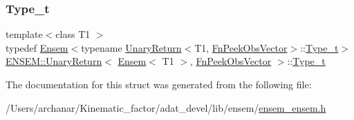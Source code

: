 \subsubsection{\texorpdfstring{Type\_t}{Type\_t}\hspace{0.1cm}{\footnotesize\ttfamily [2/2]}}
{\footnotesize\ttfamily template$<$class T1 $>$ \\
typedef \mbox{\hyperlink{classENSEM_1_1Ensem}{Ensem}}$<$typename \mbox{\hyperlink{structENSEM_1_1UnaryReturn}{Unary\+Return}}$<$T1, \mbox{\hyperlink{structENSEM_1_1FnPeekObsVector}{Fn\+Peek\+Obs\+Vector}}$>$\+::\mbox{\hyperlink{structENSEM_1_1UnaryReturn_3_01Ensem_3_01T1_01_4_00_01FnPeekObsVector_01_4_a1dc591fee09e0be58d290f5f4062e2d7}{Type\+\_\+t}}$>$ \mbox{\hyperlink{structENSEM_1_1UnaryReturn}{E\+N\+S\+E\+M\+::\+Unary\+Return}}$<$ \mbox{\hyperlink{classENSEM_1_1Ensem}{Ensem}}$<$ T1 $>$, \mbox{\hyperlink{structENSEM_1_1FnPeekObsVector}{Fn\+Peek\+Obs\+Vector}} $>$\+::\mbox{\hyperlink{structENSEM_1_1UnaryReturn_3_01Ensem_3_01T1_01_4_00_01FnPeekObsVector_01_4_a1dc591fee09e0be58d290f5f4062e2d7}{Type\+\_\+t}}}



The documentation for this struct was generated from the following file\+:\begin{DoxyCompactItemize}
\item 
/\+Users/archanar/\+Kinematic\+\_\+factor/adat\+\_\+devel/lib/ensem/\mbox{\hyperlink{lib_2ensem_2ensem__ensem_8h}{ensem\+\_\+ensem.\+h}}\end{DoxyCompactItemize}
